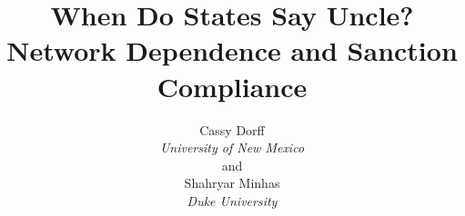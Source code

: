 \documentclass[12pt,onesided]{amsart}
\title{When Do States Say Uncle? Network Dependence and Sanction Compliance\\}
\author{Cassy Dorff\\
\textit{University of New Mexico}\\
and\\
Shahryar Minhas\\
\textit{Duke University}}
\begin{document}
\maketitle\thispagestyle{empty}

\begin{quote}
\small{\singlespacing{}}
\end{quote}

\newpage\setcounter{page}{1} 













\newpage


\end{document}
